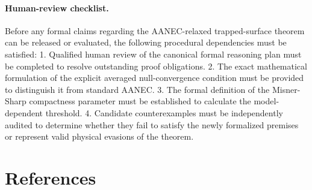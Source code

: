 \documentclass[conference]{IEEEtran}
\begin{document}
\paragraph{Human-review checklist.} Before any formal claims regarding the AANEC-relaxed trapped-surface theorem can be released or evaluated, the following procedural dependencies must be satisfied: 1. Qualified human review of the canonical formal reasoning plan must be completed to resolve outstanding proof obligations. 2. The exact mathematical formulation of the explicit averaged null-convergence condition must be provided to distinguish it from standard AANEC. 3. The formal definition of the Misner-Sharp compactness parameter must be established to calculate the model-dependent threshold. 4. Candidate counterexamples must be independently audited to determine whether they fail to satisfy the newly formalized premises or represent valid physical evasions of the theorem.\section*{References}


\end{document}
